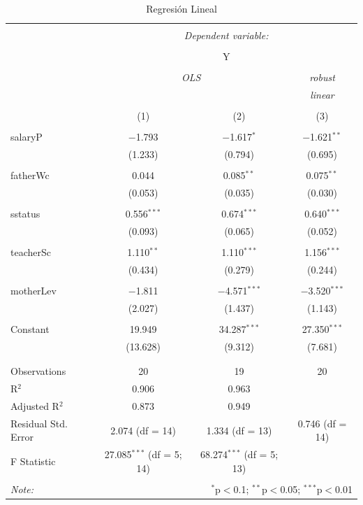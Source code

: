 \documentclass[10pt,a4paper]{article}\usepackage[]{graphicx}\usepackage[]{color}
\begin{document}
\begin{table}[!htbp] \centering 
  \caption{Regresión Lineal} 
  \label{} 
\begin{tabular}{@{\extracolsep{5pt}}lccc} 
\\[-1.8ex]\hline 
\hline \\[-1.8ex] 
 & \multicolumn{3}{c}{\textit{Dependent variable:}} \\ 
\cline{2-4} 
\\[-1.8ex] & \multicolumn{3}{c}{Y} \\ 
\\[-1.8ex] & \multicolumn{2}{c}{\textit{OLS}} & \textit{robust} \\ 
 & \multicolumn{2}{c}{\textit{}} & \textit{linear} \\ 
\\[-1.8ex] & (1) & (2) & (3)\\ 
\hline \\[-1.8ex] 
 salaryP & $-$1.793 & $-$1.617$^{*}$ & $-$1.621$^{**}$ \\ 
  & (1.233) & (0.794) & (0.695) \\ 
  & & & \\ 
 fatherWc & 0.044 & 0.085$^{**}$ & 0.075$^{**}$ \\ 
  & (0.053) & (0.035) & (0.030) \\ 
  & & & \\ 
 sstatus & 0.556$^{***}$ & 0.674$^{***}$ & 0.640$^{***}$ \\ 
  & (0.093) & (0.065) & (0.052) \\ 
  & & & \\ 
 teacherSc & 1.110$^{**}$ & 1.110$^{***}$ & 1.156$^{***}$ \\ 
  & (0.434) & (0.279) & (0.244) \\ 
  & & & \\ 
 motherLev & $-$1.811 & $-$4.571$^{***}$ & $-$3.520$^{***}$ \\ 
  & (2.027) & (1.437) & (1.143) \\ 
  & & & \\ 
 Constant & 19.949 & 34.287$^{***}$ & 27.350$^{***}$ \\ 
  & (13.628) & (9.312) & (7.681) \\ 
  & & & \\ 
\hline \\[-1.8ex] 
Observations & 20 & 19 & 20 \\ 
R$^{2}$ & 0.906 & 0.963 &  \\ 
Adjusted R$^{2}$ & 0.873 & 0.949 &  \\ 
Residual Std. Error & 2.074 (df = 14) & 1.334 (df = 13) & 0.746 (df = 14) \\ 
F Statistic & 27.085$^{***}$ (df = 5; 14) & 68.274$^{***}$ (df = 5; 13) &  \\ 
\hline 
\hline \\[-1.8ex] 
\textit{Note:}  & \multicolumn{3}{r}{$^{*}$p$<$0.1; $^{**}$p$<$0.05; $^{***}$p$<$0.01} \\ 
\end{tabular} 
\end{table} 
\end{document}
